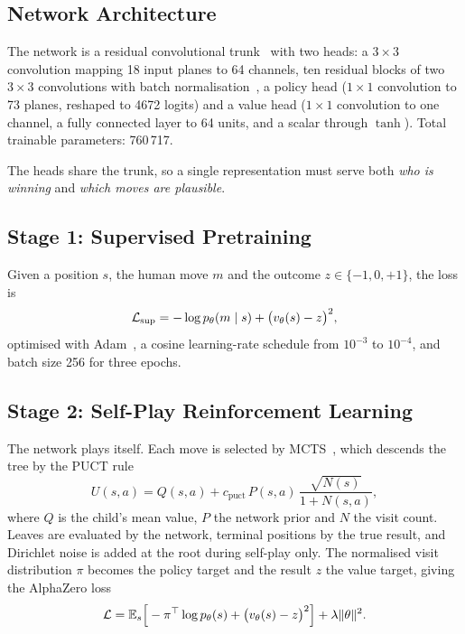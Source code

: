 \documentclass{article}
\def\L{{\cal L}}
\begin{document}
\subsection{Network Architecture}

The network is a residual convolutional trunk~\cite{he2016resnet} with two heads: a $3\times3$
convolution mapping 18 input planes to 64 channels, ten residual
blocks of two $3\times3$ convolutions with batch normalisation~\cite{ioffe2015batchnorm}, a policy head
($1\times1$ convolution to 73 planes, reshaped to 4672 logits)
and a value head ($1\times1$ convolution to one channel, a fully connected
layer to 64 units, and a scalar through $\tanh$). Total trainable
parameters: 760\,717.

The heads share the trunk, so a single representation must serve both
\emph{who is winning} and \emph{which moves are plausible}.

\subsection{Stage 1: Supervised Pretraining}

Given a position $s$, the human move $m$ and the outcome $z\in\{-1,0,+1\}$,
the loss is
\begin{equation}
\L_{\text{sup}} = -\log p_{\theta}(m \mid s) + \big(v_{\theta}(s)-z\big)^2 ,
\end{equation}
optimised with Adam~\cite{kingma2015adam}, a cosine learning-rate schedule from $10^{-3}$ to
$10^{-4}$, and batch size 256 for three epochs.

\subsection{Stage 2: Self-Play Reinforcement Learning}
\label{sec:selfplay}

The network plays itself. Each move is selected by MCTS~\cite{kocsis2006uct, browne2012mcts}, which descends the
tree by the PUCT rule~\cite{rosin2011puct}
\begin{equation}
U(s,a) = Q(s,a) + c_{\text{puct}}\,P(s,a)\,\frac{\sqrt{N(s)}}{1+N(s,a)},
\end{equation}
where $Q$ is the child's mean value, $P$ the network prior and $N$ the
visit count. Leaves are evaluated by the network, terminal positions by the
true result, and Dirichlet noise is added at the root during self-play only.
The normalised visit distribution $\pi$ becomes the policy target and the
result $z$ the value target, giving the AlphaZero loss
\begin{equation}
\L = \mathbb{E}_{s}\Big[-\pi^{\top}\log p_{\theta}(s)
      + \big(v_{\theta}(s)-z\big)^2\Big] + \lambda\lVert\theta\rVert^2 .
\label{eq:azloss}
\end{equation}
\end{document}
